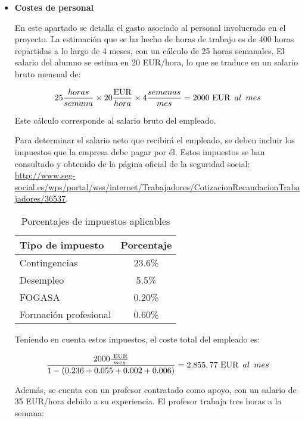 \begin{itemize}
\item \textbf{Costes de personal}

En este apartado se detalla el gasto asociado al personal involucrado en el proyecto. 
La estimación que se ha hecho de horas de trabajo es de 400 horas repartidas a lo largo de 4 meses, con un cálculo de 25 horas semanales. El salario del alumno se estima en 20 EUR/hora, lo que se traduce en un salario bruto mensual de:

$$ 25\frac{horas}{semana} \times 20\frac{\text{EUR}}{hora} \times 4\frac{semanas}{mes} = 2000 \text{ EUR} \hspace{0.5em}al\hspace{0.5em}mes $$

Este cálculo corresponde al salario bruto del empleado.

Para determinar el salario neto que recibirá el empleado, se deben incluir los impuestos que la empresa debe pagar por él. Estos impuestos se han consultado y obtenido de la página oficial de la seguridad social: \url{http://www.seg-social.es/wps/portal/wss/internet/Trabajadores/CotizacionRecaudacionTrabajadores/36537}.

\begin{table}[ht!]
    \centering
    \begin{tabular}{|l|c|}
    \hline
    \textbf{Tipo de impuesto} & \textbf{Porcentaje} \\ \hline
    Contingencias & 23.6\% \\ \hline
    Desempleo & 5.5\% \\ \hline
    FOGASA & 0.20\% \\ \hline
    Formación profesional & 0.60\% \\ \hline
    \end{tabular}
    \caption{Porcentajes de impuestos aplicables}
    \label{tab:impuestos}
\end{table}


Teniendo en cuenta estos impuestos, el coste total del empleado es:

$$\frac{2000\frac{\text{ EUR}}{mes}}{1 - (0.236 + 0.055 + 0.002 + 0.006)} = 2.855,77 \text{ EUR} \hspace{0.5em}al\hspace{0.5em}mes$$

Además, se cuenta con un profesor contratado como apoyo, con un salario de 35 EUR/hora debido a su experiencia. El profesor trabaja tres horas a la semana:


\end{itemize}
